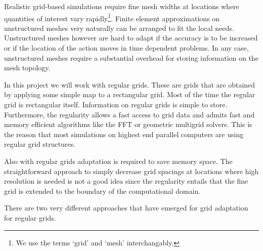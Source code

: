 \documentclass[11pt,pdftex]{article}
\begin{document}
Realistic grid-based simulations require fine mesh widths at locations
where quantities of interest vary rapidly\footnote{We use the terms
  `grid' and `mesh' interchangably.}.  Finite element approximations on
unstructured meshes very naturally can be arranged to fit the local
needs.  Unstructured meshes however are hard to adapt if the accuracy is
to be increased or if the location of the action moves in time dependent
problems.  In any case, unstructured meshes require a substantial
overhead for storing information on the mesh topology.

In this project we will work with regular grids.  These are grids that
are obtained by applying some simple map to a rectangular grid.  Most of
the time the regular grid is rectangular itself.  Information on regular
grids is simple to store.  Furthermore, the regularity allows a fast
access to grid data and admits fast and memory efficient algorithms like
the FFT or geometric multigrid solvers.  This is the reason that most
simulations on highest end parallel computers are using regular grid
structures.

Also with regular grids adaptation is required to save memory space.
The straightforward approach to simply decrease grid spacings at
locations where high resolution is needed is not a good idea since the
regularity entails that the fine grid is extended to the boundary of the
computational domain.

There are two very different approaches that have emerged for grid
adaptation for regular grids.
\end{document}
